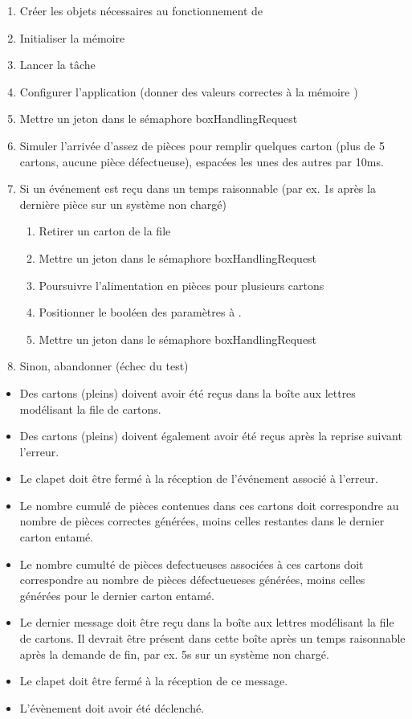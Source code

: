 {
\begin{enumerate}
	\item Créer les objets nécessaires au fonctionnement de 
	\item Initialiser la mémoire 
	\item Lancer la tâche 
	\item Configurer l'application (donner des valeurs correctes à la mémoire )
	\item Mettre un jeton dans le sémaphore boxHandlingRequest
	\item Simuler l'arrivée d'assez de pièces pour remplir quelques carton (plus de 5 cartons, aucune pièce défectueuse), espacées les unes des autres par 10ms.
	\item Si un événement  est reçu dans un temps raisonnable (par ex. 1s après la dernière pièce sur un système non chargé)
		\begin{enumerate}
			\item Retirer un carton de la file
			\item Mettre un jeton dans le sémaphore boxHandlingRequest
			\item Poursuivre l'alimentation en pièces pour plusieurs cartons
			\item Positionner le booléen  des paramètres à .
			\item Mettre un jeton dans le sémaphore boxHandlingRequest
		\end{enumerate}
	\item Sinon, abandonner (échec du test)
\end{enumerate}
}
{
\begin{itemize}
	\item Des cartons (pleins) doivent avoir été reçus dans la boîte aux lettres modélisant la file de cartons.
	\item Des cartons (pleins) doivent également avoir été reçus après la reprise suivant l'erreur.
	\item Le clapet doit être fermé à la réception de l'événement associé à l'erreur.
	\item Le nombre cumulé de pièces contenues dans ces cartons doit correspondre au nombre de pièces correctes générées, moins celles restantes dans le dernier carton entamé.
	\item Le nombre cumulté de pièces defectueuses associées à ces cartons doit correspondre au nombre de pièces défectueueses générées, moins celles générées pour le dernier carton entamé.
	\item Le dernier message doit être reçu dans la boîte aux lettres modélisant la file de cartons. Il devrait être présent dans cette boîte après un temps raisonnable après la demande de fin, par ex. 5s sur un système non chargé.
	\item Le clapet doit être fermé à la réception de ce message.
	\item L'évènement  doit avoir été déclenché.
\end{itemize}
}

